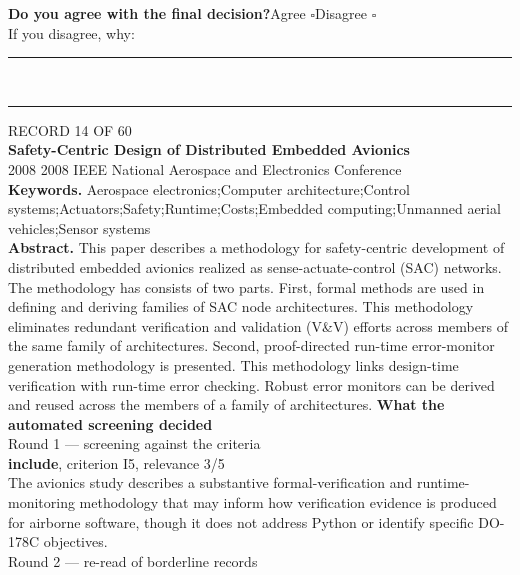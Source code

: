 \documentclass[11pt,a4paper]{article}
\begin{document}
\vspace{2mm}
{\small\textbf{Do you agree with the final decision?}\quad{}Agree $\square$\qquad{}Disagree $\square$}\\[1mm]
{\footnotesize\color{soft}If you disagree, why:}\\[1mm]
\color{rule}\rule{\linewidth}{0.3pt}\\[3mm]\rule{\linewidth}{0.3pt}\color{black}
\clearpage
{\color{soft}\footnotesize RECORD 14 OF 60}\\[1mm]
{\large\bfseries Safety-Centric Design of Distributed Embedded Avionics}\\[1.5mm]
{\color{soft}\small 2008 \textperiodcentered{} 2008 IEEE National Aerospace and Electronics Conference}\\[2mm]
{\small\textbf{Keywords.} Aerospace electronics;Computer architecture;Control systems;Actuators;Safety;Runtime;Costs;Embedded computing;Unmanned aerial vehicles;Sensor systems}\\[2mm]
{\small\textbf{Abstract.} This paper describes a methodology for safety-centric development of distributed embedded avionics realized as sense-actuate-control (SAC) networks. The methodology has consists of two parts. First, formal methods are used in defining and deriving families of SAC node architectures. This methodology eliminates redundant verification and validation (V\&V) efforts across members of the same family of architectures. Second, proof-directed run-time error-monitor generation methodology is presented. This methodology links design-time verification with run-time error checking. Robust error monitors can be derived and reused across the members of a family of architectures.}
\vspace{3mm}
\vspace{2.5mm}
{\small\textbf{What the automated screening decided}}\\[2mm]
{\footnotesize\color{soft}Round 1 --- screening against the criteria}\\[0.5mm]
{\small\textbf{include}, criterion I5, relevance 3/5}\\[0.5mm]
{\small The avionics study describes a substantive formal-verification and runtime-monitoring methodology that may inform how verification evidence is produced for airborne software, though it does not address Python or identify specific DO-178C objectives.}\\[2.5mm]
{\footnotesize\color{soft}Round 2 --- re-read of borderline records}\\[0.5mm]
\end{document}
